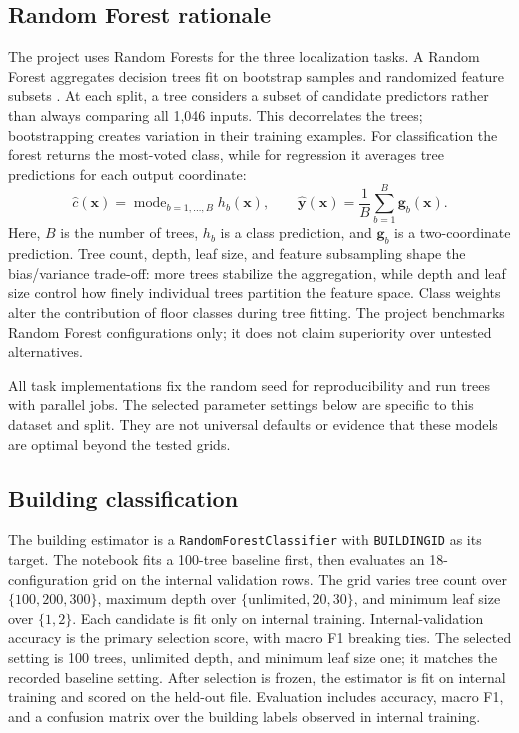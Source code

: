 \documentclass[conference]{IEEEtran}
\begin{document}
\subsection{Random Forest rationale}
The project uses Random Forests for the three localization tasks. A Random Forest aggregates decision trees fit on bootstrap samples and randomized feature subsets \cite{breiman2001}. At each split, a tree considers a subset of candidate predictors rather than always comparing all 1,046 inputs. This decorrelates the trees; bootstrapping creates variation in their training examples. For classification the forest returns the most-voted class, while for regression it averages tree predictions for each output coordinate:
\[
\hat{c}(\mathbf{x})=\operatorname{mode}_{b=1,\ldots,B} h_b(\mathbf{x}),\qquad
\hat{\mathbf{y}}(\mathbf{x})=\frac{1}{B}\sum_{b=1}^{B}\mathbf{g}_b(\mathbf{x}).
\]
Here, \(B\) is the number of trees, \(h_b\) is a class prediction, and \(\mathbf{g}_b\) is a two-coordinate prediction. Tree count, depth, leaf size, and feature subsampling shape the bias/variance trade-off: more trees stabilize the aggregation, while depth and leaf size control how finely individual trees partition the feature space. Class weights alter the contribution of floor classes during tree fitting. The project benchmarks Random Forest configurations only; it does not claim superiority over untested alternatives.

All task implementations fix the random seed for reproducibility and run trees with parallel jobs. The selected parameter settings below are specific to this dataset and split. They are not universal defaults or evidence that these models are optimal beyond the tested grids.

\subsection{Building classification}
The building estimator is a \texttt{RandomForestClassifier} with \texttt{BUILDINGID} as its target. The notebook fits a 100-tree baseline first, then evaluates an 18-configuration grid on the internal validation rows. The grid varies tree count over \(\{100,200,300\}\), maximum depth over \(\{\text{unlimited},20,30\}\), and minimum leaf size over \(\{1,2\}\). Each candidate is fit only on internal training. Internal-validation accuracy is the primary selection score, with macro F1 breaking ties. The selected setting is 100 trees, unlimited depth, and minimum leaf size one; it matches the recorded baseline setting. After selection is frozen, the estimator is fit on internal training and scored on the held-out file. Evaluation includes accuracy, macro F1, and a confusion matrix over the building labels observed in internal training.
\end{document}
